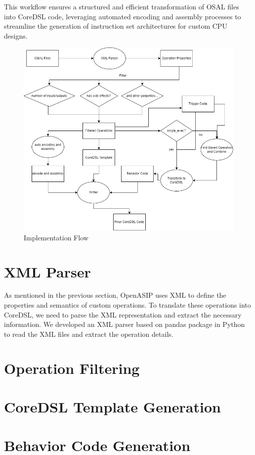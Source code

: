 This workflow ensures a structured and efficient transformation of OSAL files into CoreDSL code, leveraging automated encoding and assembly processes to streamline the generation of instruction set architectures for custom CPU designs.

\begin{figure}[h]
  \centering
  \includegraphics[width=\linewidth]{figures/flow.png}
  \caption{Implementation Flow}
\end{figure}

\section{XML Parser}

As mentioned in the previous section, OpenASIP uses XML to define the properties and semantics of custom operations.
To translate these operations into CoreDSL, we need to parse the XML representation and extract the necessary information.
We developed an XML parser based on pandas package in Python to read the XML files and extract the operation details.


\section{Operation Filtering}

\section{CoreDSL Template Generation}

\section{Behavior Code Generation}